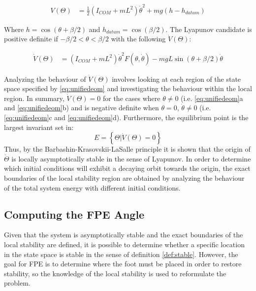 \begin{equation}
	\begin{aligned}
		V(\Theta) &= {\frac{1}{2}({I_{COM}} + m{L^2}){\dot \theta ^2} + mg(h - {h_{datum}})}	
		\end{aligned}
\end{equation}

Where $h =\cos (\theta+\beta/2) $ and $h_{datum} = \cos (\beta/2)$. The Lyapunov candidate is positive definite if $-\beta/2 < \theta < \beta/2$ with the following $\dot{V}(\Theta)$: 

\begin{equation}
	\begin{aligned}
			\dot{V}(\Theta) &= ({I_{COM}} + m{L^2}){\dot \theta ^2}F(\theta ,\dot \theta ) - mgL\sin (\theta  + \beta /2)\dot \theta
	\end{aligned}
\end{equation}

Analyzing the behaviour of $\dot{V}(\Theta)$ involves looking at each region of the state space specified by \eqref{eq:unifiedeom} and investigating the behaviour within the local region. In summary, $\dot{V}(\Theta) = 0$ for the cases where $\theta \not= 0$  (i.e. \ref{eq:unifiedeom}a and \ref{eq:unifiedeom}b) and is negative definite when $\theta = 0$, $\dot{\theta} \not= 0$ (i.e. \ref{eq:unifiedeom}c and \ref{eq:unifiedeom}d). Furthermore, the equilibrium point is the largest invariant set in: 
\[E = \left\{ {\Theta |\dot V(\Theta ) = 0} \right\}\]
Thus, by the Barbashin-Krasovskii-LaSalle principle it is shown that the origin of $\dot{\Theta}$ is locally asymptotically stable in the sense of Lyapunov. In order to determine which initial conditions will exhibit a decaying orbit towards the origin, the exact boundaries of the local stability region are obtained by analyzing the behaviour of the total system energy with different initial conditions. 

\subsection{Computing the FPE Angle} %
\label{sub:computing_the_fpe_angle}
Given that the system is asymptotically stable and the exact boundaries of the local stability are defined, it is possible to determine whether a specific location in the state space is stable in the sense of definition \ref{def:stable}. However, the goal for FPE is to determine where the foot must be placed in order to restore stability, so the knowledge of the local stability is used to reformulate the problem. 

